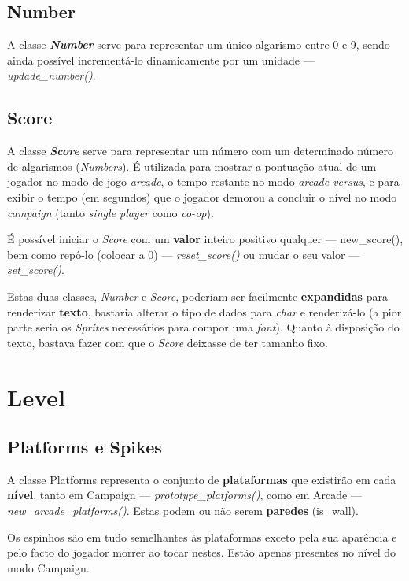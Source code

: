 \documentclass{report}
\begin{document}
\subsection{Number}

A classe \textbf{\textit{Number}} serve para representar um único algarismo entre 0 e 9, sendo ainda possível incrementá-lo dinamicamente por um unidade --- \textit{updade\_number()}.

\subsection{Score}

A classe \textbf{\textit{Score}} serve para representar um número com um determinado número de algarismos (\textit{Numbers}). É utilizada para mostrar a pontuação atual de um jogador no modo de jogo \textit{arcade}, o tempo restante no modo \textit{arcade versus}, e para exibir o tempo (em segundos) que o jogador demorou a concluir o nível no modo \textit{campaign} (tanto \textit{single player} como \textit{co-op}).

É possível iniciar o \textit{Score} com um \textbf{valor} inteiro positivo qualquer --- new\_score(), bem como repô-lo (colocar a 0) --- \textit{reset\_score()} ou mudar o seu valor --- \textit{set\_score()}. 

Estas duas classes, \textit{Number} e \textit{Score}, poderiam ser facilmente \textbf{expandidas} para renderizar \textbf{texto}, bastaria alterar o tipo de dados para \textit{char} e renderizá-lo (a pior parte seria os \textit{Sprites} necessários para compor uma \textit{font}). Quanto à disposição do texto, bastava fazer com que o \textit{Score} deixasse de ter tamanho fixo.

\section{Level}

\subsection{Platforms e Spikes}

A classe Platforms representa o conjunto de \textbf{plataformas} que existirão em cada \textbf{nível}, tanto em Campaign --- \textit{prototype\_platforms()}, como em Arcade --- \textit{new\_arcade\_platforms()}. Estas podem ou não serem \textbf{paredes} (is\_wall).

Os espinhos são em tudo semelhantes às plataformas exceto pela sua aparência e pelo facto do jogador morrer ao tocar nestes. Estão apenas presentes no nível do modo Campaign.
\end{document}
